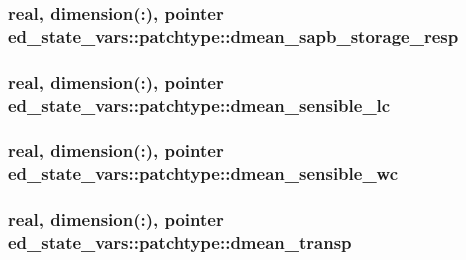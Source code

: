 \subsubsection[{\texorpdfstring{dmean\+\_\+sapb\+\_\+storage\+\_\+resp}{dmean_sapb_storage_resp}}]{\setlength{\rightskip}{0pt plus 5cm}real, dimension(\+:), pointer ed\+\_\+state\+\_\+vars\+::patchtype\+::dmean\+\_\+sapb\+\_\+storage\+\_\+resp}\hypertarget{structed__state__vars_1_1patchtype_ac87f3cebeec47f97d1678caa58427878}{}\label{structed__state__vars_1_1patchtype_ac87f3cebeec47f97d1678caa58427878}
\subsubsection[{\texorpdfstring{dmean\+\_\+sensible\+\_\+lc}{dmean_sensible_lc}}]{\setlength{\rightskip}{0pt plus 5cm}real, dimension(\+:), pointer ed\+\_\+state\+\_\+vars\+::patchtype\+::dmean\+\_\+sensible\+\_\+lc}\hypertarget{structed__state__vars_1_1patchtype_a741036bec62476e8e3cc20da69fea144}{}\label{structed__state__vars_1_1patchtype_a741036bec62476e8e3cc20da69fea144}
\subsubsection[{\texorpdfstring{dmean\+\_\+sensible\+\_\+wc}{dmean_sensible_wc}}]{\setlength{\rightskip}{0pt plus 5cm}real, dimension(\+:), pointer ed\+\_\+state\+\_\+vars\+::patchtype\+::dmean\+\_\+sensible\+\_\+wc}\hypertarget{structed__state__vars_1_1patchtype_a7a68d1e63d27b1b71701320278d18124}{}\label{structed__state__vars_1_1patchtype_a7a68d1e63d27b1b71701320278d18124}
\subsubsection[{\texorpdfstring{dmean\+\_\+transp}{dmean_transp}}]{\setlength{\rightskip}{0pt plus 5cm}real, dimension(\+:), pointer ed\+\_\+state\+\_\+vars\+::patchtype\+::dmean\+\_\+transp}\hypertarget{structed__state__vars_1_1patchtype_a762456c07f89749a3085befaa3e2ad03}{}\label{structed__state__vars_1_1patchtype_a762456c07f89749a3085befaa3e2ad03}
